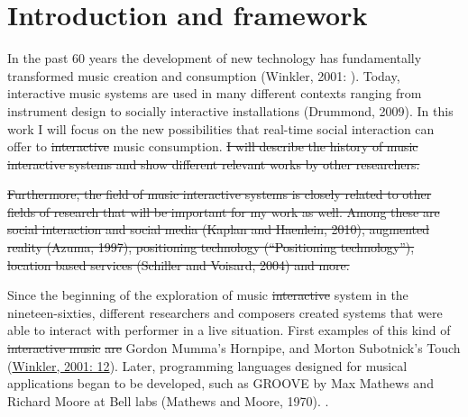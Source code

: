 \section{Introduction and framework}


In the past 60 years the development of new technology has fundamentally transformed music creation and consumption (Winkler, 2001: ). Today, interactive music systems are used in many different contexts ranging from instrument design to socially interactive installations (Drummond, 2009). In this work I will focus on the new possibilities that real-time social interaction can offer to \st{interactive} music consumption. \st{I will describe the history of music interactive systems and show different relevant works by other researchers.} 

\st{Furthermore, the field of music interactive systems is closely related to other fields of research that will be important for my work as well. Among these are social interaction and social media (Kaplan and Haenlein, 2010), augmented reality (Azuma, 1997), positioning technology (``Positioning technology''), location based services (Schiller and Voisard, 2004) and more.}

Since the beginning of the exploration  of  music \st{interactive} system in the nineteen-sixties, different researchers and composers created systems that were able to interact with performer in a live situation. First examples of this kind of \st{interactive music} \st{are}   Gordon Mumma's Hornpipe, and Morton Subotnick's Touch (\href{http://blog.lib.umn.edu/geers001/emusic/14_assig_ComposingInteractiveMusicCh1-2.pdf}{Winkler, 2001: 12}). Later, programming languages designed for musical applications began to be developed, such as GROOVE by Max Mathews and Richard Moore at Bell labs (Mathews and Moore, 1970). .

